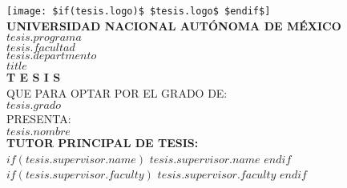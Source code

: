 

\pagestyle{plain} %


\begin{titlepage}
    \begin{center}
        \vspace*{-1.5cm} %
        
        \texttt{[image: \$if(tesis.logo)\$ \$tesis.logo\$ \$endif\$]}\\[0.5cm]
        
        {\large \textbf{UNIVERSIDAD NACIONAL AUTÓNOMA DE MÉXICO}}\\[0.4cm]
        
        {\large \textbf{\MakeUppercase{$tesis.programa$}}}\\[0.3cm]
        
        {\large \MakeUppercase{$tesis.facultad$}}\\[0.2cm]
        {\large \MakeUppercase{$tesis.departmento$}}\\[1cm]
        
        {\Large \textbf{$title$}}\\[1cm]
        
        {\LARGE \textbf{T E S I S}}\\[0.5cm]
        
        {\large QUE PARA OPTAR POR EL GRADO DE:}\\[0.3cm]
        {\Large \textbf{$tesis.grado$}}\\[1cm]
        
        {\large PRESENTA:}\\[0.3cm]
        {\LARGE \textbf{$tesis.nombre$}}\\[1.0cm]
        
        {\small \textbf{TUTOR PRINCIPAL DE TESIS:}}\\
        {\small $if(tesis.supervisor.name)$ $tesis.supervisor.name$ $endif$}\\
        {\small $if(tesis.supervisor.faculty)$ $tesis.supervisor.faculty$ $endif$}\\[0.5cm]
        

\end{center}
\end{titlepage}
